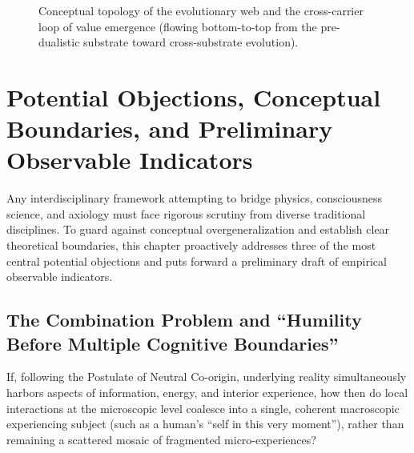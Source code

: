 \documentclass[11pt,a4paper]{article}
\begin{document}
\begin{figure}[htbp]
{%
}
\caption{Conceptual topology of the evolutionary web and the cross-carrier loop of value emergence (flowing bottom-to-top from the pre-dualistic substrate toward cross-substrate evolution).}
\label{fig:topology}
\end{figure}

\section{Potential Objections, Conceptual Boundaries, and Preliminary Observable Indicators}

Any interdisciplinary framework attempting to bridge physics, consciousness science, and axiology must face rigorous scrutiny from diverse traditional disciplines. To guard against conceptual overgeneralization and establish clear theoretical boundaries, this chapter proactively addresses three of the most central potential objections and puts forward a preliminary draft of empirical observable indicators.

\subsection{The Combination Problem and ``Humility Before Multiple Cognitive Boundaries''}

If, following the Postulate of Neutral Co-origin, underlying reality simultaneously harbors aspects of information, energy, and interior experience, how then do local interactions at the microscopic level coalesce into a single, coherent macroscopic experiencing subject (such as a human's ``self in this very moment''), rather than remaining a scattered mosaic of fragmented micro-experiences?
\end{document}
